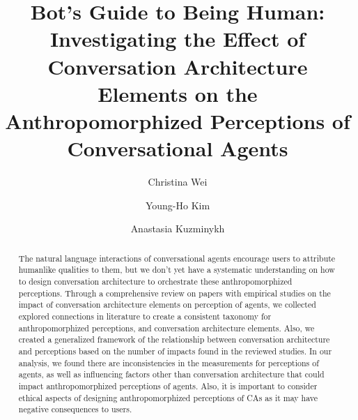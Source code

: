 \documentclass[sigconf,screen,review, anonymous]{acmart}
\begin{document}

\title[Bot's Guide to Being Human]{Bot's Guide to Being Human: Investigating the Effect of Conversation Architecture Elements on the Anthropomorphized Perceptions of Conversational Agents}


\author{Christina Wei}

\author{Young-Ho Kim}

\author{Anastasia Kuzminykh}

\renewcommand{\shortauthors}{Wei, Kim, and Kuzminykh}

\begin{abstract}
The natural language interactions of conversational agents encourage users to attribute humanlike qualities to them, but we don't yet have a systematic understanding on how to design conversation architecture to orchestrate these anthropomorphized perceptions. Through a comprehensive review on papers with empirical studies on the impact of conversation architecture elements on perception of agents, we collected explored connections in literature to create a consistent taxonomy for anthropomorphized perceptions, and conversation architecture elements. Also, we created a generalized framework of the relationship between conversation architecture and perceptions based on the number of impacts found in the reviewed studies. In our analysis, we found there are inconsistencies in the measurements for perceptions of agents, as well as influencing factors other than conversation architecture that could impact anthropomorphized perceptions of agents. Also, it is important to consider ethical aspects of designing anthropomorphized perceptions of CAs as it may have negative consequences to users.
\end{abstract}
\end{document}
